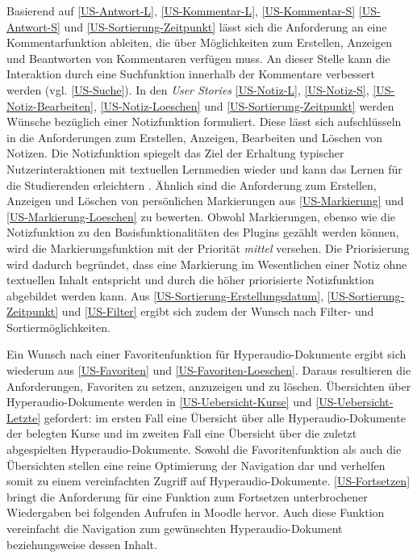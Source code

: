 Basierend auf \ref{US-Antwort-L}, \ref{US-Kommentar-L}, \ref{US-Kommentar-S} \ref{US-Antwort-S} und \ref{US-Sortierung-Zeitpunkt} lässt sich die Anforderung an eine Kommentarfunktion ableiten, die über Möglichkeiten zum Erstellen, Anzeigen und Beantworten von Kommentaren verfügen muss. An dieser Stelle kann die Interaktion durch eine Suchfunktion innerhalb der Kommentare verbessert werden (vgl. \ref{US-Suche}). In den \textit{User Stories} \ref{US-Notiz-L}, \ref{US-Notiz-S}, \ref{US-Notiz-Bearbeiten}, \ref{US-Notiz-Loeschen} und \ref{US-Sortierung-Zeitpunkt} werden Wünsche bezüglich einer Notizfunktion formuliert. Diese lässt sich aufschlüsseln in die Anforderungen zum Erstellen, Anzeigen, Bearbeiten und Löschen von Notizen. Die Notizfunktion spiegelt das Ziel der Erhaltung typischer Nutzerinteraktionen mit textuellen Lernmedien wieder und kann das Lernen für die Studierenden erleichtern \citep{scutter2010students}. Ähnlich sind die Anforderung zum Erstellen, Anzeigen und Löschen von persönlichen Markierungen aus \ref{US-Markierung} und \ref{US-Markierung-Loeschen} zu bewerten. Obwohl Markierungen, ebenso wie die Notizfunktion zu den Basisfunktionalitäten des Plugins gezählt werden können, wird die Markierungsfunktion mit der Priorität \textit{mittel} versehen. Die Priorisierung wird dadurch begründet, dass eine Markierung im Wesentlichen einer Notiz ohne textuellen Inhalt entspricht und durch die höher priorisierte Notizfunktion abgebildet werden kann. Aus \ref{US-Sortierung-Erstellungsdatum}, \ref{US-Sortierung-Zeitpunkt} und \ref{US-Filter} ergibt sich zudem der Wunsch nach Filter- und Sortiermöglichkeiten. 

Ein Wunsch nach einer Favoritenfunktion für Hyperaudio-Dokumente ergibt sich wiederum aus \ref{US-Favoriten} und \ref{US-Favoriten-Loeschen}. Daraus resultieren die Anforderungen, Favoriten zu setzen, anzuzeigen und zu löschen. Übersichten über Hyperaudio-Dokumente werden in \ref{US-Uebersicht-Kurse} und \ref{US-Uebersicht-Letzte} gefordert: im ersten Fall eine Übersicht über alle Hyperaudio-Dokumente der belegten Kurse und im zweiten Fall eine Übersicht über die zuletzt abgespielten Hyperaudio-Dokumente. Sowohl die Favoritenfunktion als auch die Übersichten stellen eine reine Optimierung der Navigation dar und verhelfen somit zu einem vereinfachten Zugriff auf Hyperaudio-Dokumente. \ref{US-Fortsetzen} bringt die Anforderung für eine Funktion zum Fortsetzen unterbrochener Wiedergaben bei folgenden Aufrufen in Moodle hervor. Auch diese Funktion vereinfacht die Navigation zum gewünschten Hyperaudio-Dokument beziehungsweise dessen Inhalt.

